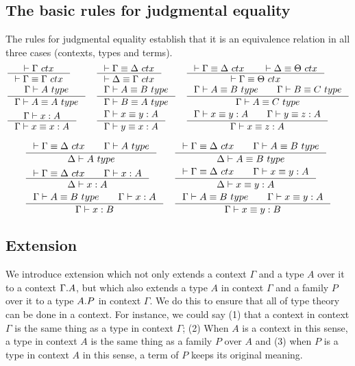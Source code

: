 \subsection{The basic rules for judgmental equality}
The rules for judgmental equality establish that it is an equivalence relation
in all three cases (contexts, types and terms).
\begin{align}
& \inference{\jctx{\Gamma}}{\jctxeq{\Gamma}{\Gamma}} 
& & \inference{\jctxeq{\Gamma}{\Delta}}{\jctxeq{\Delta}{\Gamma}} 
& & \inference{\jctxeq{\Gamma}{\Delta}\qquad\jctxeq{\Delta}{\Theta}}{\jctxeq{\Gamma}{\Theta}}\\
& \inference{\jtype{\Gamma}{A}}{\jtypeeq{\Gamma}{A}{A}} 
& & \inference{\jtypeeq{\Gamma}{A}{B}}{\jtypeeq{\Gamma}{B}{A}}
& & \inference{\jtypeeq{\Gamma}{A}{B}\qquad\jtypeeq{\Gamma}{B}{C}}{\jtypeeq{\Gamma}{A}{C}}\\
& \inference{\jterm{\Gamma}{A}{x}}{\jtermeq{\Gamma}{A}{x}{x}}
& & \inference{\jtermeq{\Gamma}{A}{x}{y}}{\jtermeq{\Gamma}{A}{y}{x}}
& & \inference{\jtermeq{\Gamma}{A}{x}{y}\qquad\jtermeq{\Gamma}{A}{y}{z}}{\jtermeq{\Gamma}{A}{x}{z}}
\end{align}

\begin{align}
& \inference{\jctxeq{\Gamma}{\Delta}\qquad\jtype{\Gamma}{A}}{\jtype{\Delta}{A}}
& & \inference{\jctxeq{\Gamma}{\Delta}\qquad\jtypeeq{\Gamma}{A}{B}}{\jtypeeq{\Delta}{A}{B}}\\
& \inference{\jctxeq{\Gamma}{\Delta}\qquad\jterm{\Gamma}{A}{x}}{\jterm{\Delta}{A}{x}}
& & \inference{\jctxeq{\Gamma}{\Delta}\qquad\jtermeq{\Gamma}{A}{x}{y}}{\jtermeq{\Delta}{A}{x}{y}}\\
& \inference{\jtypeeq{\Gamma}{A}{B}\qquad \jterm{\Gamma}{A}{x}}{\jterm{\Gamma}{B}{x}}
& & \inference{\jtypeeq{\Gamma}{A}{B}\qquad\jtermeq{\Gamma}{A}{x}{y}}{\jtermeq{\Gamma}{B}{x}{y}}
\end{align}

\subsection{Extension}
We introduce extension which not only extends a context $\Gamma$ and a type
$A$ over it to a context $\ctxext{\Gamma}{A}$, but which also extends a type $A$
in context $\Gamma$ and a family $P$ over it to a type $\ctxext{A}{P}$ in context
$\Gamma$. We do this to ensure that all of type theory can be done in a context.
For instance, we could say (1) that a context in context $\Gamma$ is the same thing
as a type in context $\Gamma$; (2) When $A$ is a context in this sense, a type in
context $A$ is the same thing as a family $P$ over $A$ and (3) when $P$ is a type
in context $A$ in this sense, a term of $P$ keeps its original meaning.

